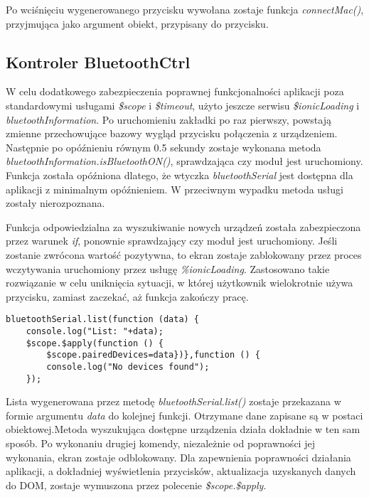 Po wciśnięciu wygenerowanego przycisku wywołana zostaje funkcja \textit{connectMac()}, przyjmująca jako argument obiekt, przypisany do przycisku.


\subsection{Kontroler BluetoothCtrl}


W celu dodatkowego zabezpieczenia poprawnej funkcjonalności aplikacji poza standardowymi usługami \textit{\$scope} i \textit{\$timeout}, użyto jeszcze serwisu \textit{\$ionicLoading} i \textit{bluetoothInformation}. Po uruchomieniu zakładki po raz pierwszy, powstają zmienne przechowujące bazowy wygląd przycisku połączenia z urządzeniem. Następnie po opóźnieniu równym 0.5 sekundy zostaje wykonana metoda \textit{bluetoothInformation.isBluetoothON()}, sprawdzająca czy moduł jest uruchomiony. Funkcja została opóźniona dlatego, że  wtyczka \textit{bluetoothSerial} jest dostępna dla aplikacji z minimalnym opóźnieniem. W przeciwnym wypadku metoda usługi zostały nierozpoznana.

Funkcja odpowiedzialna za wyszukiwanie nowych urządzeń została zabezpieczona przez warunek \textit{if}, ponownie sprawdzający czy moduł jest uruchomiony. Jeśli zostanie zwrócona wartość pozytywna, to ekran zostaje zablokowany przez proces wczytywania uruchomiony przez usługę \textit{\%ionicLoading}.  Zastosowano takie rozwiązanie w celu uniknięcia sytuacji, w której użytkownik wielokrotnie używa przycisku, zamiast zaczekać, aż funkcja zakończy pracę.

\begin{lstlisting}
bluetoothSerial.list(function (data) {
	console.log("List: "+data);
	$scope.$apply(function () {
		$scope.pairedDevices=data})},function () {
		console.log("No devices found");
	});
\end{lstlisting}
Lista wygenerowana przez metodę \textit{bluetoothSerial.list()} zostaje przekazana w formie argumentu \textit{data} do kolejnej funkcji. Otrzymane dane zapisane są w postaci obiektowej.Metoda wyszukująca dostępne urządzenia działa dokładnie w ten sam sposób. Po wykonaniu drugiej komendy, niezależnie od poprawności jej wykonania, ekran zostaje odblokowany. Dla zapewnienia poprawności działania aplikacji, a dokładniej wyświetlenia przycisków, aktualizacja uzyskanych danych do DOM, zostaje wymuszona przez polecenie \textit{\$scope.\$apply}.

